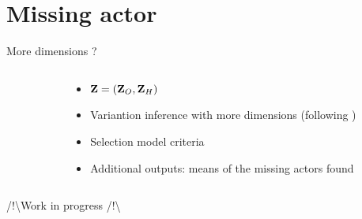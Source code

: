 \documentclass[11pt]{beamer}
\newcommand\Zb{{\bf Z}}
\newcommand{\edgeunit}{1.5}
\begin{document}
\section{Missing actor}
\begin{frame}{More dimensions ?}
\begin{columns}
\begin{column}{0.3\linewidth}
\begin{center}
\end{center}
\end{column}

\begin{column}{0.65\linewidth}
\pause
\begin{itemize}
\item $\Zb = (\Zb_O,\Zb_H)$
\item Variantion inference with more dimensions (following \citet{genevieve})
\item Selection model criteria
\item Additional outputs: means of the missing actors found
\end{itemize}
\end{column}
\end{columns}

\bigskip\bigskip
\begin{center}
/!\textbackslash Work in progress /!\textbackslash 
\end{center}
\end{frame}
\end{document}

